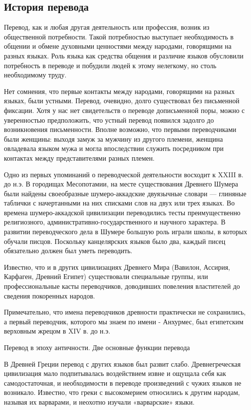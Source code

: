 \subsection*{История перевода}

Перевод, как и любая другая деятельность или профессия, возник из общественной потребности. Такой потребностью выступает необходимость в общении и обмене духовными ценностями между народами, говорящими на разных языках. Роль языка как средства общения и различие языков обусловили потребность в переводе и побудили людей к этому нелегкому, но столь необходимому труду.

Нет сомнения, что первые контакты между народами, говорящими на разных языках, были устными. Перевод, очевидно, долго существовал без письменной фиксации. Хотя у нас нет свидетельств о переводе дописьменной поры, можно с уверенностью предположить, что устный перевод появился задолго до возникновения письменности. Вполне возможно, что первыми переводчиками были женщины: выходя замуж за мужчину из другого племени, женщина овладевала языком мужа и могла впоследствии служить посредником при контактах между представителями разных племен.

Одно из первых упоминаний о переводческой деятельности восходит к XXIII в. до н.э. В городищах Месопотамии, на месте существования Древнего Шумера были найдены своеобразные шумеро-аккадские двуязычные словари --- глиняные таблички с начертанными на них списками слов на двух или трех языках. Во времена шумеро-аккадской цивилизации переводились тесты преимущественно религиозного, административно-государственного и научного характера. В развитии переводческого дела в Шумере большую роль играли школы, в которых обучали писцов. Поскольку канцелярских языков было два, каждый писец обязательно должен был уметь переводить.

Известно, что и в других цивилизациях Древнего Мира (Вавилон, Ассирия, Карфаген, Древний Египет) существовали специальные группы, или профессиональные касты переводчиков, доводивших повеления властителей до сведения покоренных народов.

Примечательно, что имена переводчиков древности практически не сохранились, а первый        переводчик, которого мы знаем по имени - Анхурмес, был египетским верховным жрецом в XIV в. до н.э.

 Перевод в эпоху античности. Две основные функции перевода

В Древней Греции перевод с других языков был развит слабо. Древнегреческая цивилизация мало подпитывалась воздействием извне и ощущала себя как самодостаточная, и необходимости в переводе произведений с чужих языков не возникало. Известно, что греки с высокомерием относились к другим народам, называя их варварами, и неохотно изучали «варварские» языки.

